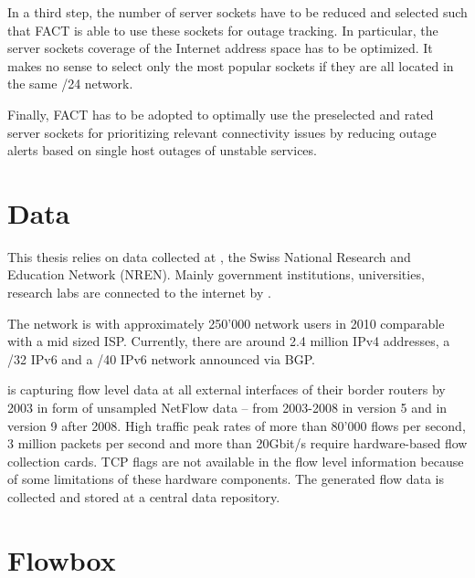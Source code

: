 In a third step, the number of server sockets have to be reduced and selected
such that FACT is able to use these sockets for outage tracking. In particular,
the server sockets coverage of the Internet address space has to be optimized.
It makes no sense to select only the most popular sockets if they are all
located in the same /24 network.

Finally, FACT has to be adopted to optimally use the preselected and rated
server sockets for prioritizing relevant connectivity issues by reducing outage
alerts based on single host outages of unstable services.

\section{Data
\label{section:data}}

This thesis relies on data collected at \citet{switch}, the Swiss National 
Research and Education Network (NREN). Mainly government institutions, 
universities, research labs are connected to the internet by \citet{switch}\citep{Schatzmann:Mining}.

The \citet{switch} network is with approximately 250'000 network users in 2010 comparable with a mid sized ISP. Currently, there are around 2.4 million IPv4 addresses, a /32 IPv6 and a /40 IPv6 network announced via BGP\citep{Schatzmann:Tracing}.

\citet{switch} is capturing flow level data at all external interfaces of their border routers by 2003 in form of unsampled NetFlow data -- from 2003-2008 in version 5 and in version 9 after 2008\citep{Schatzmann:Tracing}.
High traffic peak rates of more than 80'000 flows per second, 3 million packets per second and more than 20Gbit/s require hardware-based flow collection cards. TCP flags are not available in the flow level information because of some limitations of these hardware components. The generated flow data is collected and stored at a central data repository.

\section{Flowbox
\label{section:flowbox}}

